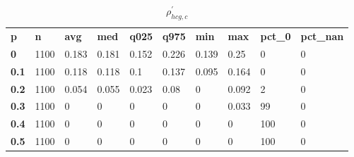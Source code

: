 \begin{table}[h]
 \centering 
\footnotesize
\caption{$\rho_{hcg,c}^\prime $}
\label{tab:alphahcgc}
\begin{tabular}[h]{| l l l l l l l l l l|
    } \hline
\textbf{ p} & \textbf{ n} & \textbf{ avg} & \textbf{ med} & \textbf{ q025} & \textbf{ q975} & \textbf{ min} & \textbf{ max} & \textbf{ pct\_0} & \textbf{ pct\_nan}
           \\
  \textbf{  0} & 1100 & 0.183 & 0.181 & 0.152 & 0.226 & 0.139 &  0.25 &   0 & 0
           \\
  \textbf{0.1} & 1100 & 0.118 & 0.118 &   0.1 & 0.137 & 0.095 & 0.164 &   0 & 0
           \\
  \textbf{0.2} & 1100 & 0.054 & 0.055 & 0.023 &  0.08 &     0 & 0.092 &   2 & 0
           \\
  \textbf{0.3} & 1100 &     0 &     0 &     0 &     0 &     0 & 0.033 &  99 & 0
           \\
  \textbf{0.4} & 1100 &     0 &     0 &     0 &     0 &     0 &     0 & 100 & 0
           \\
  \textbf{0.5} & 1100 &     0 &     0 &     0 &     0 &     0 &     0 & 100 & 0
           \\
 \hline \end{tabular}
 \end{table}
